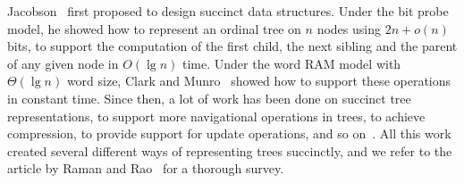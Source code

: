 Jacobson~\cite{j1989} first proposed to design succinct data structures. Under the bit probe model, he showed how to represent an ordinal tree on $n$ nodes using $2n+o(n)$ bits, to support the computation of the first child, the next sibling and the parent of any given node in $O(\lg n)$ time. 
Under the word RAM model with $\Theta(\lg n)$ word size, Clark and Munro~\cite{cm1996} showed how to support these operations in constant time. 
Since then, a lot of work has been done on succinct tree representations, to support more navigational operations in trees, to achieve compression, to provide support for update operations, and so on~\cite{mr1997,bdmr1999,grr2004,jss2007,ly2008,hms2012,fm2014,Navarro:2014:FFS:2620785.2601073}. 
All this work created several different ways of representing trees succinctly, and we refer to the article by Raman and Rao~\cite{rr2013} for a thorough survey.


